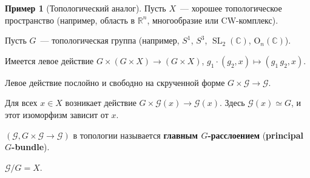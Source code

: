 \documentclass[a4paper]{article}
\DeclareMathOperator{\SL}{SL}
\renewcommand{\O}{\mathrm{O}}
\newcommand{\term}{\textbf}
\newcommand{\isom}{\simeq}
\theoremstyle{definition}
\newtheorem{example}[theorem]{Пример}
\begin{document}
\begin{example}[Топологический аналог]
Пусть $X$~--- хорошее топологическое пространство (например, область в
$\mathbb R^n$, многообразие или CW-комплекс).

Пусть $G$~--- топологическая группа (например, $S^1$, $S^3$, $\SL_2
(\mathbb{C})$, $\O_n (\mathbb{C})$).

Имеется левое действие $G \times (G\times X) \to (G\times X)$, $g_1
\cdot (g_2,x) \mapsto (g_1\,g_2, x)$.

Левое действие послойно и свободно на скрученной форме $G\times
\mathcal{G} \to \mathcal{G}$.

Для всех $x \in X$ возникает действие $G \times \mathcal{G} (x) \to
\mathcal{G} (x)$. Здесь $\mathcal{G} (x) \isom G$, и этот изоморфизм
зависит от $x$.

$(\mathcal{G}, G\times \mathcal{G} \to \mathcal{G})$ в топологии
называется \term{главным $G$-расслоением} (\term{principal
  $G$-bundle}).

$\mathcal{G}/G = X$.
\end{example}
\end{document}
